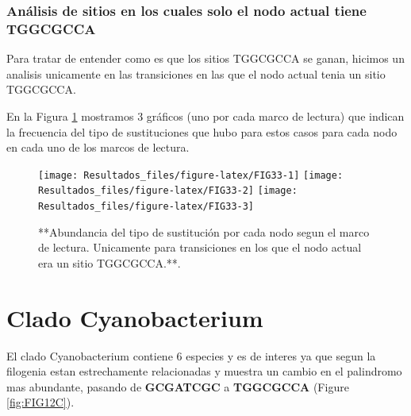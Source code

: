 \documentclass[
]{book}
\begin{document}
\hypertarget{anuxe1lisis-de-sitios-en-los-cuales-solo-el-nodo-actual-tiene-tggcgcca}{%
\subsubsection{Análisis de sitios en los cuales solo el nodo actual tiene TGGCGCCA}\label{anuxe1lisis-de-sitios-en-los-cuales-solo-el-nodo-actual-tiene-tggcgcca}}

Para tratar de entender como es que los sitios TGGCGCCA se ganan, hicimos un analisis unicamente en las transiciones en las que el nodo actual tenia un sitio TGGCGCCA.

En la Figura \ref{fig:FIG33} mostramos 3 gráficos (uno por cada marco de lectura) que indican la frecuencia del tipo de sustituciones que hubo para estos casos para cada nodo en cada uno de los marcos de lectura.

\begin{figure}

{\centering \texttt{[image: Resultados\_files/figure-latex/FIG33-1]} \texttt{[image: Resultados\_files/figure-latex/FIG33-2]} \texttt{[image: Resultados\_files/figure-latex/FIG33-3]} 

}

\caption{**Abundancia del tipo de sustitución por cada nodo segun el marco de lectura. Unicamente para transiciones en los que el nodo actual era un sitio TGGCGCCA.**.}\label{fig:FIG33}
\end{figure}

\hypertarget{clado-cyanobacterium}{%
\section{Clado Cyanobacterium}\label{clado-cyanobacterium}}

El clado Cyanobacterium contiene 6 especies y es de interes ya que segun la filogenia estan estrechamente relacionadas y muestra un cambio en el palindromo mas abundante, pasando de \textbf{GCGATCGC} a \textbf{TGGCGCCA} (Figure \ref{fig:FIG12C}).
\end{document}
